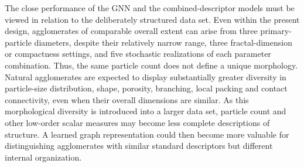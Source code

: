 \documentclass[12pt,a4paper]{article}
\begin{document}
The close performance of the GNN and the combined-descriptor models must be
viewed in relation to the deliberately structured data set. Even within the present
design, agglomerates of comparable overall extent can arise from three
primary-particle diameters, despite their relatively narrow range, three
fractal-dimension or compactness settings, and five stochastic realizations of
each parameter combination. Thus, the same particle count does not define a
unique morphology. Natural agglomerates are expected to display substantially
greater diversity in particle-size distribution, shape, porosity, branching,
local packing and contact connectivity, even when their overall dimensions are
similar. As this morphological diversity is introduced into a larger data set,
particle count and other low-order scalar measures may become less complete
descriptions of structure. A learned graph representation could then become
more valuable for distinguishing agglomerates with similar standard descriptors
but different internal organization. 



\printbibliography
\end{document}
